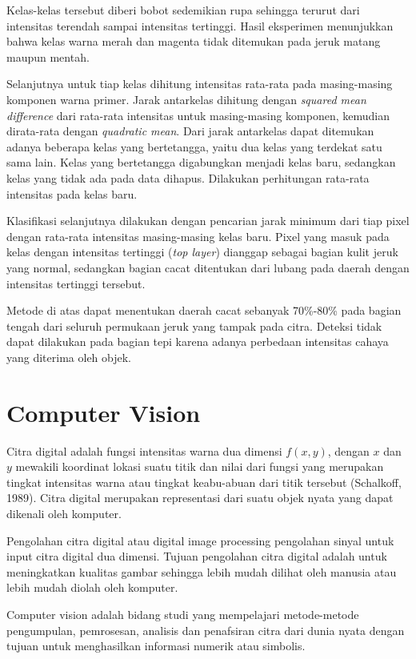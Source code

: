 \documentclass[laporan.tex]{subfiles}
\begin{document}
Kelas-kelas tersebut diberi bobot sedemikian rupa sehingga terurut dari intensitas terendah sampai intensitas tertinggi. Hasil eksperimen menunjukkan bahwa kelas warna merah dan magenta tidak ditemukan pada jeruk matang maupun mentah.

Selanjutnya untuk tiap kelas dihitung intensitas rata-rata pada masing-masing komponen warna primer. Jarak antarkelas dihitung dengan \emph{squared mean difference} dari rata-rata intensitas untuk masing-masing komponen, kemudian dirata-rata dengan \emph{quadratic mean}. Dari jarak antarkelas dapat ditemukan adanya beberapa kelas yang bertetangga, yaitu dua kelas yang terdekat satu sama lain. Kelas yang bertetangga digabungkan menjadi kelas baru, sedangkan kelas yang tidak ada pada data dihapus. Dilakukan perhitungan rata-rata intensitas pada kelas baru.

Klasifikasi selanjutnya dilakukan dengan pencarian jarak minimum dari tiap pixel dengan rata-rata intensitas masing-masing kelas baru. Pixel yang masuk pada kelas dengan intensitas tertinggi (\emph{top layer}) dianggap sebagai bagian kulit jeruk yang normal, sedangkan bagian cacat ditentukan dari lubang pada daerah dengan intensitas tertinggi tersebut.

Metode di atas dapat menentukan daerah cacat sebanyak 70\%-80\% pada bagian tengah dari seluruh permukaan jeruk yang tampak pada citra. Deteksi tidak dapat dilakukan pada bagian tepi karena adanya perbedaan intensitas cahaya yang diterima oleh objek.

\section{Computer Vision}

Citra digital adalah fungsi intensitas warna dua dimensi $f(x,y)$, dengan $x$ dan $y$ mewakili koordinat lokasi suatu titik dan nilai dari fungsi yang merupakan tingkat intensitas warna atau tingkat keabu-abuan dari titik tersebut (Schalkoff, 1989). Citra digital merupakan representasi dari suatu objek nyata yang dapat dikenali oleh komputer.

Pengolahan citra digital atau digital image processing pengolahan sinyal untuk input citra digital dua dimensi. Tujuan pengolahan citra digital adalah untuk meningkatkan kualitas gambar sehingga lebih mudah dilihat oleh manusia atau lebih mudah diolah oleh komputer.

Computer vision adalah bidang studi yang mempelajari metode-metode pengumpulan, pemrosesan, analisis dan penafsiran citra dari dunia nyata dengan tujuan untuk menghasilkan informasi numerik atau simbolis.
\end{document}
